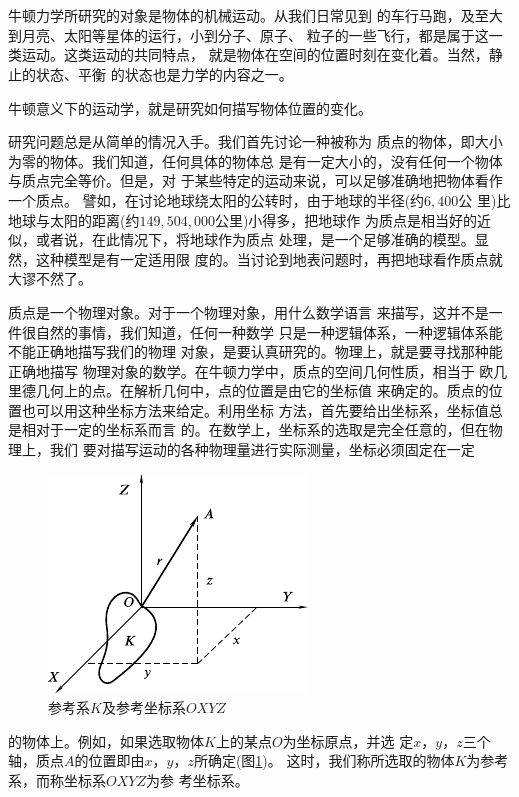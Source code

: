 \section[参考系]{}\label{sec:01.04}

牛顿力学所研究的对象是物体的机械运动。从我们日常见到
的车行马跑，及至大到月亮、太阳等星体的运行，小到分子、原子、
粒子的一些飞行，都是属于这一类运动。这类运动的共同特点，
就是物体在空间的位置时刻在变化着。当然，静止的状态、平衡
的状态也是力学的内容之一。

牛顿意义下的运动学，就是研究如何描写物体位置的变化。

研究问题总是从简单的情况入手。我们首先讨论一种被称为
质点的物体，即大小为零的物体。我们知道，任何具体的物体总
是有一定大小的，没有任何一个物体与质点完全等价。但是，对
于某些特定的运动来说，可以足够准确地把物体看作一个质点。
譬如，在讨论地球绕太阳的公转时，由于地球的半径(约$ 6,400 $公
里)比地球与太阳的距离(约$ 149,504,000 $公里)小得多，把地球作
为质点是相当好的近似，或者说，在此情况下，将地球作为质点
处理，是一个足够准确的模型。显然，这种模型是有一定适用限
度的。当讨论到地表问题时，再把地球看作质点就大谬不然了。

质点是一个物理对象。对于一个物理对象，用什么数学语言
来描写，这并不是一件很自然的事情，我们知道，任何一种数学
只是一种逻辑体系，一种逻辑体系能不能正确地描写我们的物理
对象，是要认真研究的。物理上，就是要寻找那种能正确地描写
物理对象的数学。在牛顿力学中，质点的空间几何性质，相当于
欧几里德几何上的点。在解析几何中，点的位置是由它的坐标值
来确定的。质点的位置也可以用这种坐标方法来给定。利用坐标
方法，首先要给出坐标系，坐标值总是相对于一定的坐标系而言
的。在数学上，坐标系的选取是完全任意的，但在物理上，我们
要对描写运动的各种物理量进行实际测量，坐标必须固定在一定
\begin{figure}
  \includegraphics{figure/fig01.04}
  \caption{参考系$K$及参考坐标系$OXYZ$}
  \label{fig:01.04}
\end{figure}
的物体上。例如，如果选取物体$K$上的某点$O$为坐标原点，并选
定$x$，$y$，$z$三个轴，质点$A$的位置即由$x$，$y$，$z$所确定(图\ref{fig:01.04})。
这时，我们称所选取的物体$K$为参考系，而称坐标系$OXYZ$为参
考坐标系。

